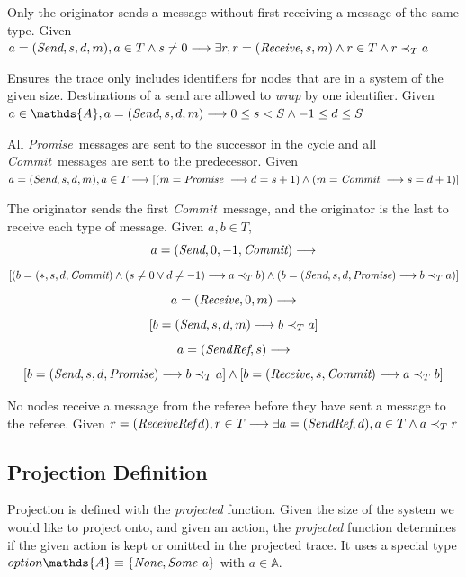 \documentclass[runningheads]{llncs}
\newcommand{\send}{\emph{Send}}
\newcommand{\receive}{\emph{Receive}}
\newcommand{\sendref}{\emph{SendRef}}
\newcommand{\receiveref}{\emph{ReceiveRef}}
\newcommand{\action}{\mathds{A}}
\newcommand{\promise}{\emph{Promise}}
\newcommand{\commit}{\emph{Commit}}
\newcommand{\happensbefore}{\prec_T}
\begin{document}
\begin{definition} Only the originator sends a message without first receiving a message of the same type.
Given $a = (\send, s, d, m), a \in T \wedge s \neq 0 \longrightarrow \exists r, r = (\receive, s, m) \wedge r \in T \wedge r \happensbefore a$
\end{definition}

\begin{definition} Ensures the trace only includes identifiers for nodes that are in a system of the given size. Destinations of a send are allowed to \emph{wrap} by one identifier. Given $a \in \action, a = (\send, s, d, m) \longrightarrow 0 \le s < S \wedge -1 \le d \le S$
\end{definition}

\begin{definition} All \promise\ messages are sent to the successor in the cycle and all \commit\ messages are sent to the predecessor. Given $a = (\send, s, d, m), a \in T \longrightarrow [(m = \promise\ \longrightarrow d = s + 1) \wedge (m = \commit\ \longrightarrow s = d + 1)]$
\end{definition}
\begin{definition} The originator sends the first \commit\ message, and the originator is the last to receive each type of message. Given $a, b \in T$,
$$ 
a = (\send, 0, -1, \commit) \longrightarrow 
$$
$$
[
(b = (*, s, d, \commit) \wedge (s \neq 0 \vee d \neq -1) \longrightarrow a \happensbefore b)
\wedge 
(b = (\send, s, d, \promise) \longrightarrow b \happensbefore a)
]
$$
$$
a = (\receive, 0, m) \longrightarrow 
$$
$$
[
b = (\send, s, d, m) \longrightarrow b \happensbefore a
]
$$
$$
a = (\sendref, s) \longrightarrow 
$$
$$
[
b = (\send, s, d, \promise) \longrightarrow b \happensbefore a
]
\wedge
[
b = (\receive, s, \commit) \longrightarrow a \happensbefore b
]
$$
\end{definition}
\begin{definition} No nodes receive a message from the referee before they have sent a message to the referee. Given $r = (\receiveref\, d), r \in T \longrightarrow \exists a = (\sendref, d), a \in T \wedge a \happensbefore r$
\end{definition}


\subsection{Projection Definition}
\label{sec:projection}
Projection is defined with the \emph{projected} function. Given the size of the system we would like to project onto, and given an action, the \emph{projected} function determines if the given action is kept or omitted in the projected trace. It uses a special type  
$option \action \equiv \{\emph{None}, \emph{Some a}\}$ with $a \in \action$.
\end{document}
